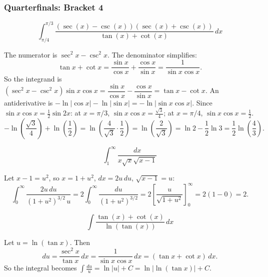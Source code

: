 \subsubsection*{Quarterfinals: Bracket 4}
\begin{questions}

\question \[\int_{\pi/4}^{\pi/3} \frac{(\sec(x)-\csc(x))(\sec(x)+\csc(x))}{\tan(x)+\cot(x)}\,dx\]
\begin{solution}
The numerator is $\sec^2x-\csc^2x$. The denominator simplifies:
\[
\tan x+\cot x=\frac{\sin x}{\cos x}+\frac{\cos x}{\sin x}=\frac{1}{\sin x\cos x}.
\]
So the integrand is $(\sec^2x-\csc^2x)\sin x\cos x=\dfrac{\sin x}{\cos x}-\dfrac{\cos x}{\sin x}=\tan x-\cot x$.
An antiderivative is $-\ln|\cos x|-\ln|\sin x|=-\ln|\sin x\cos x|$.
Since $\sin x\cos x=\tfrac12\sin2x$: at $x=\pi/3$, $\sin x\cos x=\tfrac{\sqrt3}{4}$; at $x=\pi/4$, $\sin x \cos x=\tfrac12$.
\[
-\ln\!\left(\frac{\sqrt3}{4}\right)+\ln\!\left(\frac12\right)=\ln\!\left(\frac{4}{\sqrt3}\cdot\frac12\right)=\ln\!\left(\frac{2}{\sqrt3}\right)=\ln2-\frac12\ln3=\frac12\ln\!\left(\frac43\right).
\]
\end{solution}

\question \[\int_1^\infty \frac{dx}{x\sqrt{x}\sqrt{x-1}}\]
\begin{solution}
Let $x-1=u^2$, so $x=1+u^2$, $dx=2u\,du$, $\sqrt{x-1}=u$:
\[
\int_0^\infty \frac{2u\,du}{(1+u^2)^{3/2}\,u}=2\int_0^\infty \frac{du}{(1+u^2)^{3/2}}=2\left[\frac{u}{\sqrt{1+u^2}}\right]_0^\infty=2(1-0)=2.
\]
\end{solution}

\question \[\int \frac{\tan(x)+\cot(x)}{\ln(\tan(x))}\,dx\]
\begin{solution}
Let $u=\ln(\tan x)$. Then
\[
du=\frac{\sec^2x}{\tan x}\,dx=\frac{1}{\sin x\cos x}\,dx=(\tan x+\cot x)\,dx.
\]
So the integral becomes $\displaystyle\int \frac{du}{u}=\ln|u|+C=\ln\big|\ln(\tan x)\big|+C$.
\end{solution}

\end{questions}

